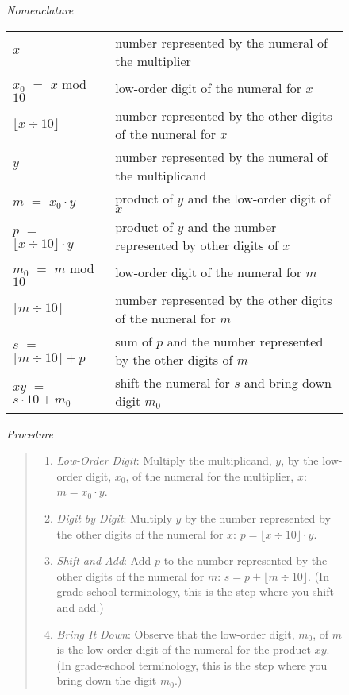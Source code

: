 \begin{figure}
\emph{Nomenclature}
\begin{center}
\begin{tabular}{ll}
$x$                         &number represented by the numeral of the multiplier\\
$x_0$ $=$ $x$ mod $10$      &low-order digit of the numeral for $x$\\
$\lfloor x\div 10\rfloor$   &number represented by the other digits of the numeral for $x$\\
$y$                         &number represented by the numeral of the multiplicand\\
$m$   $=$ $x_0\cdot y$      &product of $y$ and the low-order digit of $x$\\
$p$   $=$ $\lfloor x\div 10\rfloor\cdot y$ &product of $y$ and the number represented by other digits of $x$\\
$m_0$ $=$ $m$ mod $10$      &low-order digit of the numeral for $m$\\
$\lfloor m\div 10\rfloor$   &number represented by the other digits of the numeral for $m$\\
$s$   $=$ $\lfloor m\div 10\rfloor + p$    &sum of $p$ and the number represented by the other digits of $m$\\
$x y$ $=$ $s\cdot 10 + m_0$ &shift the numeral for $s$ and bring down digit $m_0$\\
\end{tabular}
\end{center}

\emph{Procedure}
\begin{quote}
\begin{enumerate}
\item \emph{Low-Order Digit}:
Multiply the multiplicand, $y$, by the low-order digit, $x_0$,
of the numeral for the multiplier, $x$: $m = x_0\cdot y$.

\item \emph{Digit by Digit}:
Multiply $y$ by the number
represented by the other digits of the numeral for $x$:
$p=\lfloor x\div 10\rfloor\cdot y$.

\item \emph{Shift and Add}:
Add $p$ to the number represented by
the other digits of the numeral for $m$: $s = p + \lfloor m\div 10\rfloor$.
(In grade-school terminology, this is the step where you
shift and add.)

\item \emph{Bring It Down}:
Observe that the low-order digit, $m_0$, of $m$
is the low-order digit of the numeral for the product $x y$.
(In grade-school terminology,
this is the step where you bring down the digit $m_0$.)


\end{enumerate}
\end{quote}
\end{figure}
